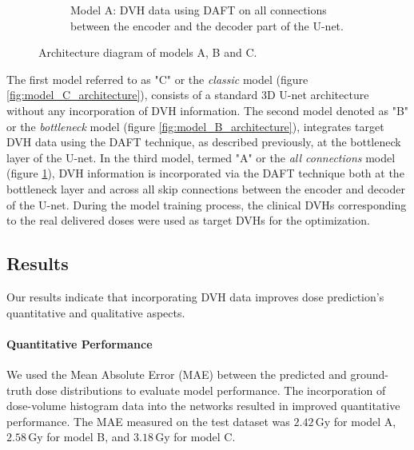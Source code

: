 \begin{figure}
\begin{subfigure}{\linewidth}
		\caption{Model A: DVH data using DAFT on all connections between the encoder and the decoder part of the U-net.}
		\label{fig:model_A_architecture}
	\end{subfigure}
	\caption{Architecture diagram of models A, B and C.}
	\label{fig:models_ABC_architectures}
\end{figure}

The first model referred to as "C" or the \textit{classic} model (figure \ref{fig:model_C_architecture}), consists of a standard 3D U-net architecture without any incorporation of DVH information.
The second model denoted as "B" or the \textit{bottleneck} model (figure \ref{fig:model_B_architecture}), integrates target DVH data using the DAFT technique, as described previously, at the bottleneck layer of the U-net.
In the third model, termed "A" or the \textit{all connections} model (figure \ref{fig:model_A_architecture}), DVH information is incorporated via the DAFT technique both at the bottleneck layer and across all skip connections between the encoder and decoder of the U-net.
During the model training process, the clinical DVHs corresponding to the real delivered doses were used as target DVHs for the optimization.

\subsection{Results}
Our results indicate that incorporating DVH data improves dose prediction's quantitative and qualitative aspects.

\paragraph{Quantitative Performance}
We used the Mean Absolute Error (MAE) between the predicted and ground-truth dose distributions to evaluate model performance.
The incorporation of dose-volume histogram data into the networks resulted in improved quantitative performance.
The MAE measured on the test dataset was $2.42\,\text{Gy}$ for model A, $2.58\,\text{Gy}$ for model B, and $3.18\,\text{Gy}$ for model C.

